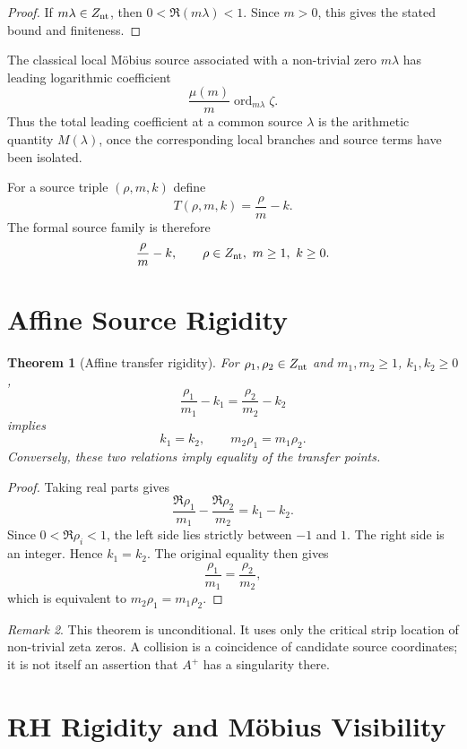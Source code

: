 \documentclass[11pt,a4paper]{article}
\newtheorem{theorem}{Theorem}[section]
\theoremstyle{remark}
\newtheorem{remark}[theorem]{Remark}
\newcommand{\ord}{\operatorname{ord}}
\begin{document}
\begin{proof}
If $m\lambda\in Z_{\rm nt}$, then $0<\Re(m\lambda)<1$. Since $m>0$, this gives the stated bound and finiteness.
\end{proof}

The classical local Möbius source associated with a non-trivial zero $m\lambda$ has leading logarithmic coefficient
\[
\frac{\mu(m)}m\ord_{m\lambda}\zeta.
\]
Thus the total leading coefficient at a common source $\lambda$ is the arithmetic quantity $M(\lambda)$, once the corresponding local branches and source terms have been isolated.

For a source triple $(\rho,m,k)$ define
\[
\boxed{T(\rho,m,k)=\frac{\rho}{m}-k.}
\tag{3.3}
\]
The formal source family is therefore
\[
\frac{\rho}{m}-k,\qquad \rho\in Z_{\rm nt},\ m\ge1,\ k\ge0.
\]

\section{Affine Source Rigidity}

\begin{theorem}[Affine transfer rigidity]
For $\rho_1,\rho_2\in Z_{\rm nt}$ and $m_1,m_2\ge1$, $k_1,k_2\ge0$,
\[
\frac{\rho_1}{m_1}-k_1=\frac{\rho_2}{m_2}-k_2
\]
implies
\[
\boxed{k_1=k_2,\qquad m_2\rho_1=m_1\rho_2.}
\tag{4.1}
\]
Conversely, these two relations imply equality of the transfer points.
\end{theorem}

\begin{proof}
Taking real parts gives
\[
\frac{\Re\rho_1}{m_1}-\frac{\Re\rho_2}{m_2}=k_1-k_2.
\]
Since $0<\Re\rho_i<1$, the left side lies strictly between $-1$ and $1$. The right side is an integer. Hence $k_1=k_2$. The original equality then gives
\[
\frac{\rho_1}{m_1}=\frac{\rho_2}{m_2},
\]
which is equivalent to $m_2\rho_1=m_1\rho_2$.
\end{proof}

\begin{remark}
This theorem is unconditional. It uses only the critical strip location of non-trivial zeta zeros. A collision is a coincidence of candidate source coordinates; it is not itself an assertion that $A^+$ has a singularity there.
\end{remark}

\section{RH Rigidity and Möbius Visibility}
\end{document}
